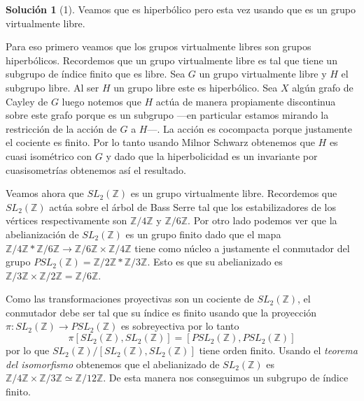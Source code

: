\documentclass[12pt]{article}
\theoremstyle{plain}
\theoremstyle{definition}
\newtheorem*{sol}{Solución}
\theoremstyle{remark}
\newcommand\ZZ{\mathbb{Z}}
\begin{document}
\begin{sol}[1]
Veamos que es hiperbólico pero esta vez usando que es un grupo virtualmente libre.

Para eso primero veamos que los grupos virtualmente libres son grupos hiperbólicos. Recordemos que un grupo virtualmente libre es tal que tiene un subgrupo de índice finito que es libre. Sea $G$ un grupo virtualmente libre y $H$ el subgrupo libre. Al ser $H$ un grupo libre este es hiperbólico. Sea $X$ algún grafo de Cayley de $G$ luego notemos que $H$ actúa de manera propiamente discontinua sobre este grafo porque es un subgrupo ---en particular estamos mirando la restricción de la acción de $G$ a $H$---. La acción es cocompacta porque justamente el cociente es finito. Por lo tanto usando Milnor Schwarz obtenemos que $H$ es cuasi isométrico con $G$ y dado que la hiperbolicidad es un invariante por cuasisometrías obtenemos así el resultado.

Veamos ahora que $SL_2(\ZZ)$ es un grupo virtualmente libre. Recordemos que $SL_2(\ZZ)$ actúa sobre el árbol de Bass Serre tal que los estabilizadores de los vértices respectivamente son $\ZZ / 4 \ZZ$ y $\ZZ /6 \ZZ$. Por otro lado podemos ver que la abelianización de $SL_2(\ZZ)$ es un grupo finito  dado que el mapa $\ZZ/4\ZZ * \ZZ/6\ZZ \to \ZZ / 6\ZZ \times \ZZ / 4\ZZ$ tiene como núcleo a justamente el conmutador del grupo $PSL_2(\ZZ) = \ZZ / 2 \ZZ * \ZZ / 3 \ZZ $. Esto es que su abelianizado es $\ZZ / 3\ZZ \times \ZZ / 2\ZZ = \ZZ / 6 \ZZ$.

 Como las transformaciones proyectivas son un cociente de $SL_2(\ZZ)$, el conmutador debe ser tal que su índice es finito usando que la proyección $\pi:SL_2(\ZZ) \to PSL_2(\ZZ)$ es sobreyectiva por lo tanto 
 \begin{equation*}
 	\pi[SL_2(\ZZ),SL_2(\ZZ)] = [PSL_2(\ZZ),PSL_2(\ZZ)]
 \end{equation*}
  por lo que $SL_2(\ZZ) / [SL_2(\ZZ), SL_2(\ZZ)]$ tiene orden finito. Usando el \emph{teorema del isomorfismo} obtenemos que el abelianizado de $SL_2(\ZZ)$ es $\ZZ/4\ZZ \times \ZZ/3\ZZ \simeq \ZZ / 12\ZZ$.  
  De esta manera nos conseguimos un subgrupo de índice finito. 
  

\end{sol}
\end{document}
